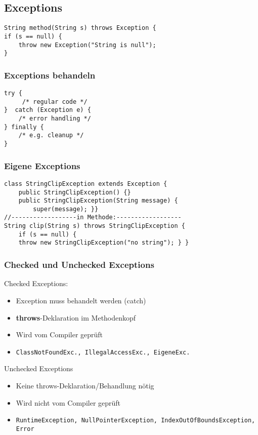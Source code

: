 \begin{multicols*}{5}
	
	\subsection{Exceptions}
	\begin{lstlisting}
String method(String s) throws Exception {
if (s == null) {
	throw new Exception("String is null"); 
} 
		\end{lstlisting}
		
		\subsubsection{Exceptions behandeln}
		\begin{lstlisting}
try {
	 /* regular code */ 
}  catch (Exception e) {
	/* error handling */
} finally {
	/* e.g. cleanup */ 
}
		\end{lstlisting}
		\subsubsection{Eigene Exceptions}
		\begin{lstlisting}
class StringClipException extends Exception {
	public StringClipException() {}
	public StringClipException(String message) {
		super(message); }}
//------------------in Methode:------------------
String clip(String s) throws StringClipException {
	if (s == null) {
	throw new StringClipException("no string"); } }
		\end{lstlisting}
		\subsubsection{Checked und Unchecked Exceptions}
		\textcolor{b}{Checked Exceptions:}
		\begin{itemize}
			\item Exception muss behandelt werden (catch)
			\item \textbf{throws}-Deklaration im Methodenkopf
			\item Wird vom Compiler geprüft
			\item \tiny \texttt{ClassNotFoundExc., IllegalAccessExc., EigeneExc.}
		\end{itemize}
		\textcolor{b}{Unchecked Exceptions}
		\begin{itemize}
			\item Keine throws-Deklaration/Behandlung nötig
			\item Wird nicht vom Compiler geprüft
			\item \tiny \texttt{RuntimeException, NullPointerException, IndexOutOfBoundsException, Error}
		\end{itemize}
		

\end{multicols*}
